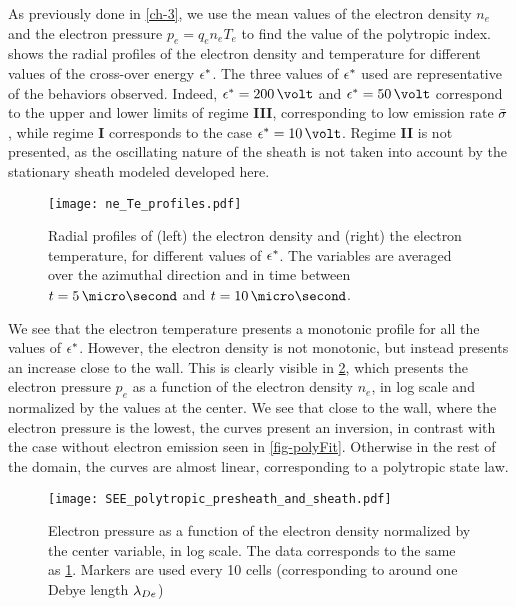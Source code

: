 As previously done in \cref{ch-3}, we use the mean values of the electron density $n_e$ and the electron pressure $ p_e = q_e n_e T_e$ to find the value of the polytropic index.
 shows the radial profiles of the electron density and temperature for different values of the cross-over energy $\epsilon^{*}$.
The three values of $\epsilon^{*}$ used are representative of the behaviors observed.
Indeed, $\crover=200\,\volt$ and $\crover=50\,\volt$ correspond to the upper and lower limits of regime {\bf III}, corresponding to low emission rate $ \bar{\sigma }$, while regime {\bf I} corresponds to the case $\crover=10\,\volt$.
Regime {\bf II} is not presented, as the oscillating nature of the sheath is not taken into account by the stationary sheath modeled developed here. 


\begin{figure}[hbtp]
  \centering
  \texttt{[image: ne\_Te\_profiles.pdf]}
  \caption{Radial profiles of (left) the electron density and (right) the electron temperature, for different values of $\epsilon^{*}$. The variables are averaged over the azimuthal direction and in time between $t=5\,\micro\second$ and $t=10\,\micro\second$.  }
  \label{fig-radial_profiles_see}
\end{figure}

We see that the electron temperature presents a monotonic profile for all the values of $\epsilon^{*}$.
However, the electron density is not monotonic, but instead presents an increase close to the wall.
This is clearly visible in \cref{fig-log_pe-ne}, which presents the electron pressure $p_e$ as a function of the electron density $n_e$, in log scale and normalized by the values at the center.
We see that close to the wall, where the electron pressure is the lowest, the curves present an inversion, in contrast with the case without electron emission seen in \cref{fig-polyFit}.
Otherwise in the rest of the domain, the curves are almost linear, corresponding to a polytropic state law.

\begin{figure}[hbtp]
  \centering
  \texttt{[image: SEE\_polytropic\_presheath\_and\_sheath.pdf]}
  \caption{Electron pressure as a function of the electron density normalized by the center variable, in log scale. The data corresponds to the same as \cref{fig-radial_profiles_see}. Markers are used every 10 cells (corresponding to around one Debye length $\lambda_{De}$)}
  \label{fig-log_pe-ne}
\end{figure}

